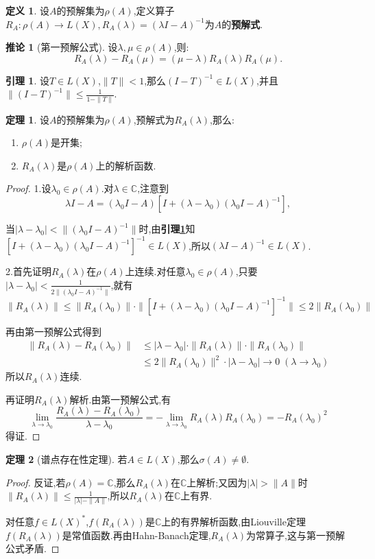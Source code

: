 \documentclass{ctexart}
\theoremstyle{definition}
\newtheorem{definition}{定义}
\newtheorem{lemma}{引理}
\newtheorem{theorem}{定理}
\newtheorem{corollary}{推论}
\theoremstyle{remark}
\newcommand\lemmaref[1]{\textbf{引理\ref{#1}}}
\begin{document}
	\begin{definition}
		设$A$的预解集为$\rho(A)$,定义算子$R_A:\rho(A)\to L(X),R_A(\lambda)=(\lambda I-A)^{-1}$为$A$的\textbf{预解式}.
	\end{definition}
	\begin{corollary}[第一预解公式]
		设$\lambda,\mu\in\rho(A)$,则:
		$$R_A(\lambda)-R_A(\mu)=(\mu-\lambda)R_A(\lambda)R_A(\mu).$$
	\end{corollary}
	\begin{lemma}\label{lemma-pre-solution}
		设$T\in L(X)$,$\|T\|<1$,那么$(I-T)^{-1}\in L(X)$,并且$\|(I-T)^{-1}\|\le\frac{1}{1-\|T\|}$.
	\end{lemma}
	\begin{theorem}
		设$A$的预解集为$\rho(A)$,预解式为$R_A(\lambda)$,那么:
		\begin{enumerate}
			\item $\rho(A)$是开集;
			\item $R_A(\lambda)$是$\rho(A)$上的解析函数.
		\end{enumerate}
	\end{theorem}
	\begin{proof}
		1.设$\lambda_0\in\rho(A)$.对$\lambda\in\mathbb{C}$,注意到
		$$\lambda I-A=(\lambda_0I-A)[I+(\lambda-\lambda_0)(\lambda_0I-A)^{-1}],$$
		
		当$|\lambda-\lambda_0|<\|(\lambda_0I-A)^{-1}\|$时,由\lemmaref{lemma-pre-solution}知$[I+(\lambda-\lambda_0)(\lambda_0I-A)^{-1}]^{-1}\in L(X)$,所以$(\lambda I-A)^{-1}\in L(X)$.
		
		2.首先证明$R_A(\lambda)$在$\rho(A)$上连续.对任意$\lambda_0\in\rho(A)$,只要$|\lambda-\lambda_0|<\frac{1}{2\|(\lambda_0I-A)^{-1}\|}$,就有
		$$\|R_A(\lambda)\|\le\|R_A(\lambda_0)\|\cdot\|[I+(\lambda-\lambda_0)(\lambda_0I-A)^{-1}]^{-1}\|\le 2\|R_A(\lambda_0)\|$$
		
		再由第一预解公式得到
		\begin{align*}
			\|R_A(\lambda)-R_A(\lambda_0)\| & \le|\lambda-\lambda_0|\cdot\|R_A(\lambda)\|\cdot\|R_A(\lambda_0)\| \\
			& \le 2\|R_A(\lambda_0)\|^2\cdot|\lambda-\lambda_0|\to 0\;(\lambda\to\lambda_0)
		\end{align*}
		所以$R_A(\lambda)$连续.
		
		再证明$R_A(\lambda)$解析.由第一预解公式,有
		$$\lim_{\lambda\to\lambda_0}\frac{R_A(\lambda)-R_A(\lambda_0)}{\lambda-\lambda_0}=-\lim_{\lambda\to\lambda_0}{R_A(\lambda)R_A(\lambda_0)}=-R_A(\lambda_0)^2$$
		得证.
	\end{proof}
	\begin{theorem}[谱点存在性定理]
		若$A\in L(X)$,那么$\sigma(A)\ne\emptyset$.
	\end{theorem}
	\begin{proof}
		反证,若$\rho(A)=\mathbb{C}$,那么$R_A(\lambda)$在$\mathbb{C}$上解析;又因为$|\lambda|>\|A\|$时$\|R_A(\lambda)\|\le\frac{1}{|\lambda|-\|A\|}$,所以$R_A(\lambda)$在$\mathbb{C}$上有界.
		
		对任意$f\in L(X)^*$,$f(R_A(\lambda))$是$\mathbb{C}$上的有界解析函数,由Liouville定理$f(R_A(\lambda))$是常值函数.再由Hahn-Banach定理,$R_A(\lambda)$为常算子,这与第一预解公式矛盾.
	\end{proof}
	
\end{document}

